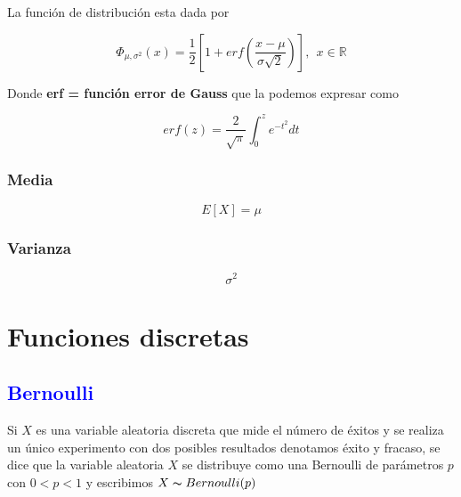 \documentclass{article}
\begin{document}
\begin{multicols}{2}
                La función de distribución esta dada por

                    \begin{equation*}
                        \Phi _{\mu,\sigma ^2}(x) = \frac{1}{2} \left[ 1+ erf\left( \frac{x-\mu}{\sigma \sqrt{2}} \right) \right], ~~x\in \mathbb{R}
                    \end{equation*}

                Donde {\bf erf = función error de Gauss} que la podemos expresar como

                    \begin{equation*}
                        erf(z) = \frac{2}{\sqrt{\pi}} \int _0^z e^{-t^2} dt
                    \end{equation*}

            \subsubsection{Media}

                \begin{equation*}
                    E[X] = \mu
                \end{equation*}
                
            \subsubsection{Varianza}

                \begin{equation*}
                    \sigma ^2 
                \end{equation*}

    \section{Funciones discretas}

        \subsection{\textcolor{blue}{Bernoulli}}
            
            Si $X$ es una variable aleatoria discreta que mide el número de éxitos y se realiza un único experimento con dos posibles resultados denotamos éxito y fracaso, se dice que la variable aleatoria $X$ se distribuye como una Bernoulli de parámetros $p$ con $0<p<1$ y escribimos   $X\thicksim Bernoulli (p)$
            

\end{multicols}
\end{document}

